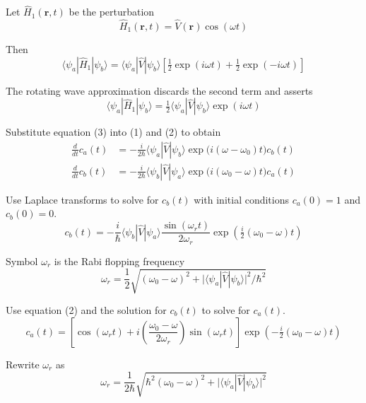 Let $\hat H_1(\mathbf r,t)$ be the perturbation
\begin{equation*}
\hat H_1(\mathbf r,t)=\hat V(\mathbf r)\cos(\omega t)
\end{equation*}

Then
\begin{equation*}
\langle\psi_a|\hat H_1|\psi_b\rangle
=\langle\psi_a|\hat V|\psi_b\rangle
\left[\tfrac{1}{2}\exp(i\omega t)+\tfrac{1}{2}\exp(-i\omega t)\right]
\end{equation*}

The rotating wave approximation discards the second term and asserts
\begin{equation*}
\langle\psi_a|\hat H_1|\psi_b\rangle=\tfrac{1}{2}\langle\psi_a|\hat V|\psi_b\rangle\exp(i\omega t)
\tag{3}
\end{equation*}

Substitute equation (3) into (1) and (2) to obtain
\begin{align*}
\frac{d}{dt}c_a(t)&=-\frac{i}{2\hbar}\langle\psi_a|\hat V|\psi_b\rangle
\exp\bigl(i(\omega-\omega_0)t\bigr)c_b(t)
\tag{4}
\\[1ex]
\frac{d}{dt}c_b(t)&=-\frac{i}{2\hbar}\langle\psi_b|\hat V|\psi_a\rangle
\exp\bigl(i(\omega_0-\omega)t\bigr)c_a(t)
\tag{5}
\end{align*}

Use Laplace transforms to solve for $c_b(t)$ with initial conditions $c_a(0)=1$ and $c_b(0)=0$.
\begin{equation*}
c_b(t)=-\frac{i}{\hbar}\langle\psi_b|\hat V|\psi_a\rangle
\frac{\sin(\omega_rt)}{2\omega_r}
\exp\left(\tfrac{i}{2}(\omega_0-\omega)t\right)
\tag{6}
\end{equation*}

Symbol $\omega_r$ is the Rabi flopping frequency
\begin{equation*}
\omega_r=\frac{1}{2}\sqrt{(\omega_0-\omega)^2
+\bigl|\langle\psi_a|\hat V|\psi_b\rangle\bigr|^2/\hbar^2}
\end{equation*}

Use equation (2) and the solution for $c_b(t)$ to solve for $c_a(t)$.
\begin{equation*}
c_a(t)=\left[\cos(\omega_rt)+i\left(\frac{\omega_0-\omega}{2\omega_r}\right)\sin(\omega_rt)\right]
\exp\left(-\tfrac{i}{2}(\omega_0-\omega)t\right)
\end{equation*}

Rewrite $\omega_r$ as
\begin{equation*}
\omega_r=\frac{1}{2\hbar}\sqrt{\hbar^2(\omega_0-\omega)^2
+\bigl|\langle\psi_a|\hat V|\psi_b\rangle\bigr|^2}
\end{equation*}

